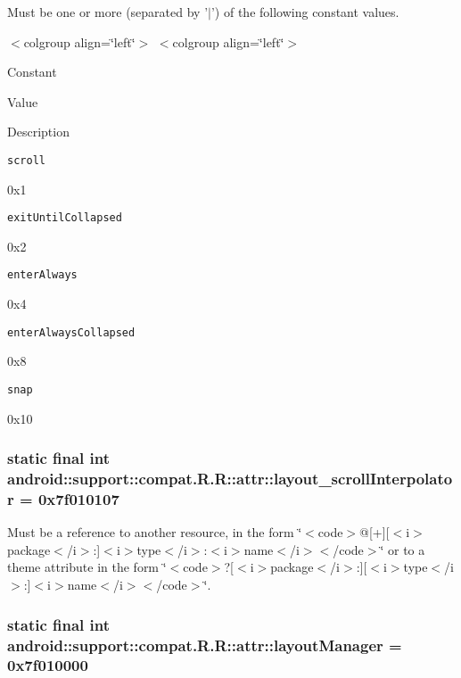 Must be one or more (separated by '$|$') of the following constant values. \begin{TabularC}{0}
\hline
\end{TabularC}
$<$colgroup align=\char`\"{}left\char`\"{}$>$ $<$colgroup align=\char`\"{}left\char`\"{}$>$ 

Constant

Value

Description 

{\tt scroll}

0x1

{\tt exitUntilCollapsed}

0x2

{\tt enterAlways}

0x4

{\tt enterAlwaysCollapsed}

0x8

{\tt snap}

0x10\hypertarget{classandroid_1_1support_1_1compat_1_1_r_1_1attr_61c5b9c7cd9b392ff8bee70704d11811}{
\subsubsection[{layout\_\-scrollInterpolator}]{\setlength{\rightskip}{0pt plus 5cm}static final int android::support::compat.R.R::attr::layout\_\-scrollInterpolator = 0x7f010107}}
\label{classandroid_1_1support_1_1compat_1_1_r_1_1attr_61c5b9c7cd9b392ff8bee70704d11811}


Must be a reference to another resource, in the form \char`\"{}$<$code$>$@\mbox{[}+\mbox{]}\mbox{[}$<$i$>$package$<$/i$>$:\mbox{]}$<$i$>$type$<$/i$>$:$<$i$>$name$<$/i$>$$<$/code$>$\char`\"{} or to a theme attribute in the form \char`\"{}$<$code$>$?\mbox{[}$<$i$>$package$<$/i$>$:\mbox{]}\mbox{[}$<$i$>$type$<$/i$>$:\mbox{]}$<$i$>$name$<$/i$>$$<$/code$>$\char`\"{}. \hypertarget{classandroid_1_1support_1_1compat_1_1_r_1_1attr_c87c9d5270877db23a876e038904c425}{
\subsubsection[{layoutManager}]{\setlength{\rightskip}{0pt plus 5cm}static final int android::support::compat.R.R::attr::layoutManager = 0x7f010000}}
\label{classandroid_1_1support_1_1compat_1_1_r_1_1attr_c87c9d5270877db23a876e038904c425}


